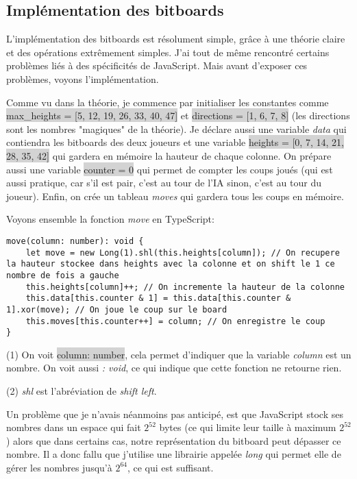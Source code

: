 \documentclass[a4paper]{article}
\newcommand{\inlinecode}[1]{\colorbox{lightgray}{#1}}
\begin{document}
\subsection{Implémentation des bitboards}

	L'implémentation des bitboards est résolument simple, grâce à une théorie claire et des opérations extrêmement simples. J'ai tout de même rencontré certains problèmes liés à des spécificités de JavaScript. Mais avant d'exposer ces problèmes, voyons l'implémentation.

	Comme vu dans la théorie, je commence par initialiser les constantes comme \newline\inlinecode{max\_heights = [5, 12, 19, 26, 33, 40, 47]} et \inlinecode{directions = [1, 6, 7, 8]} (les directions sont les nombres "magiques" de la théorie). Je déclare aussi une variable \textit{data} qui contiendra les bitboards des deux joueurs et une variable \inlinecode{heights = [0, 7, 14, 21, 28, 35, 42]} qui gardera en mémoire la hauteur de chaque colonne. On prépare aussi une variable \inlinecode{counter = 0} qui permet de compter les coups joués (qui est aussi pratique, car s'il est pair, c'est au tour de l'IA sinon, c'est au tour du joueur). Enfin, on crée un tableau \textit{moves} qui gardera tous les coups en mémoire.

	Voyons ensemble la fonction \textit{move} en TypeScript:
	\begin{lstlisting}
move(column: number): void {
    let move = new Long(1).shl(this.heights[column]); // On recupere la hauteur stockee dans heights avec la colonne et on shift le 1 ce nombre de fois a gauche
    this.heights[column]++; // On incremente la hauteur de la colonne
    this.data[this.counter & 1] = this.data[this.counter & 1].xor(move); // On joue le coup sur le board
    this.moves[this.counter++] = column; // On enregistre le coup
}
	\end{lstlisting}

	(1) On voit \inlinecode{column: number}, cela permet d'indiquer que la variable \textit{column} est un nombre. On voit aussi \textit{: void}, ce qui indique que cette fonction ne retourne rien.
	
    (2) \textit{shl} est l'abréviation de \textit{shift left}.

	
	Un problème que je n'avais néanmoins pas anticipé, est que JavaScript stock ses nombres dans un espace qui fait $2^{52}$ bytes (ce qui limite leur taille à maximum $2^{52}$) alors que dans certains cas, notre représentation du bitboard peut dépasser ce nombre. Il a donc fallu que j'utilise une librairie appelée \textit{long} qui permet elle de gérer les nombres jusqu'à $2^{64}$, ce qui est suffisant.
\end{document}
